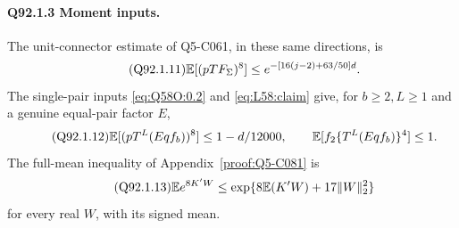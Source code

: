 \paragraph{Q92.1.3 Moment inputs.}
The unit-connector estimate of Q5-C061, in these same directions, is
\begin{equation}\tag{Q92.1.11}\label{eq:Q92:1.11}
\mathbb E[(pTF_\Sigma)^8]\le e^{-[16(j-2)+63/50]d}.
\end{equation}
The single-pair inputs \eqref{eq:Q58O:0.2} and \eqref{eq:L58:claim}
give, for \(b\ge\allowbreak 2,\allowbreak L\ge\allowbreak 1\) and a genuine equal-pair
factor \(E\),
\begin{equation}\tag{Q92.1.12}\label{eq:Q92:1.12}
\mathbb E[(pT^L(Eqf_b))^8]\le1-d/12000,\qquad
\mathbb E[f_2\{T^L(Eqf_b)\}^4]\le1.
\end{equation}
The full-mean inequality of Appendix~\ref{proof:Q5-C081} is
\begin{equation}\tag{Q92.1.13}\label{eq:Q92:1.13}
\mathbb E e^{8K'W}\le\exp\{8\mathbb E(K'W)+17\|W\|_2^2\}
\end{equation}
for every real \(W\), with its signed mean.

